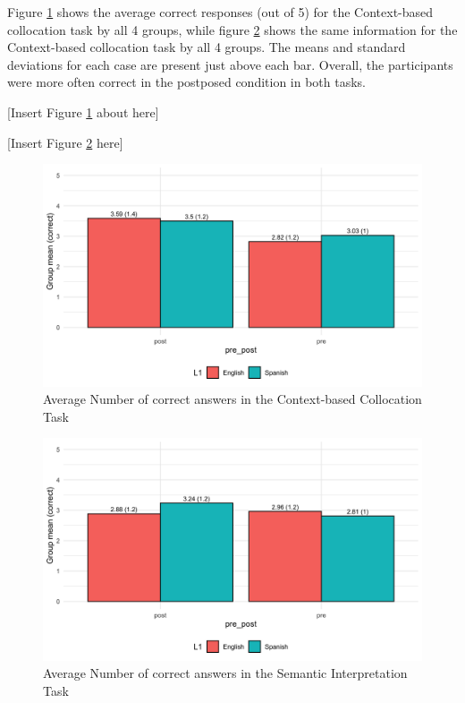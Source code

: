 \documentclass[
  man]{apa6}
\begin{document}
Figure \ref{fig:cmc-desc} shows the average correct responses (out of 5) for the Context-based collocation task by all 4 groups, while figure \ref{fig:sem-desc} shows the same information for the Context-based collocation task by all 4 groups.
The means and standard deviations for each case are present just above each bar.
Overall, the participants were more often correct in the postposed condition in both tasks.

{[}Insert Figure \ref{fig:cmc-desc} about here{]}

{[}Insert Figure \ref{fig:sem-desc} here{]}

\begin{figure}
\includegraphics[width=7.19in]{docs/figs/cbc_desc} \caption{Average Number of correct answers in the Context-based Collocation Task}\label{fig:cmc-desc}
\end{figure}

\begin{figure}
\includegraphics[width=7.19in]{docs/figs/semantic_desc} \caption{Average Number of correct answers in the Semantic Interpretation Task}\label{fig:sem-desc}
\end{figure}
\end{document}
